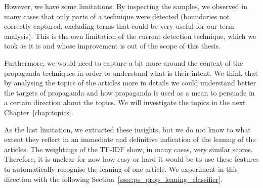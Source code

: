 However, we have some limitations. By inspecting the samples, we observed in many cases that only parts of a technique were detected (boundaries not correctly captured, excluding terms that could be very useful for our term analysis).
This is the own limitation of the current detection technique, which we took as it is and whose improvement is out of the scope of this thesis.

Furthermore, we would need to capture a bit more around the context of the propaganda techniques in order to understand what is their intent. We think that by analysing the topics of the articles more in details we could understand better the targets of propaganda and how propaganda is used as a mean to persuade in a certain direction about the topics. We will investigate the topics in the next Chapter~\ref{chap:topics}.

As the last limitation, we extracted these insights, but we do not know to what extent they reflect in an immediate and definitive indication of the leaning of the articles.
The weightings of the TF-IDF show, in many cases, very similar scores. Therefore, it is unclear for now how easy or hard it would be to use these features to automatically recognise the leaning of one article. %
We experiment in this direction with the following Section~\ref{ssec:ps_prop_leaning_classifier}.



